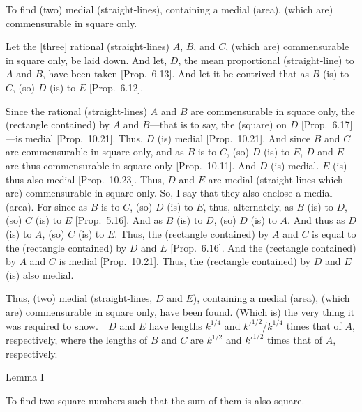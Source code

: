 To find (two) medial (straight-lines),
containing a medial (area), (which are)
commensurable in square only.

\epsfysize=0.7in
\centerline{}

Let the [three] rational (straight-lines) $A$, $B$, and $C$, (which are)
commensurable in square only, be laid down. And let, $D$,  the mean proportional
(straight-line) to $A$ and $B$, have been taken [Prop.~6.13]. And let it be contrived that as
$B$ (is) to $C$, (so) $D$ (is) to $E$ [Prop.~6.12].

Since the rational (straight-lines) $A$ and $B$ are commensurable in square only, the (rectangle contained) by $A$ and $B$---that is to say, the
(square) on $D$ [Prop.~6.17]---is medial
[Prop.~10.21]. Thus, $D$ (is) medial [Prop.~10.21]. And
since $B$ and $C$ are commensurable in square only, and as $B$ is to $C$, (so) $D$ (is) to $E$, $D$ and $E$ are thus commensurable in square
only [Prop.~10.11]. And $D$ (is) medial.
$E$ (is) thus also medial [Prop.~10.23].
Thus, $D$ and $E$ are medial (straight-lines which are) commensurable
in square only. So, I say that they also enclose a medial (area). For since
as $B$ is to $C$, (so) $D$ (is) to $E$, thus, alternately, as $B$ (is) to $D$,
(so) $C$ (is) to $E$ [Prop.~5.16]. And as
$B$ (is) to $D$, (so) $D$ (is) to $A$. And thus as $D$ (is) to $A$, (so)
$C$ (is) to $E$. Thus, the (rectangle contained) by $A$ and $C$ is equal
to the (rectangle contained) by $D$ and $E$ [Prop.~6.16]. And the (rectangle contained) by 
$A$ and $C$ is medial [Prop.~10.21]. Thus, the (rectangle contained) by $D$ and $E$ (is)
also medial.

Thus, (two) medial (straight-lines, $D$ and $E$), containing a medial (area),
(which are) commensurable in square only, have been found. (Which is)
the very thing it was required to show.
{\footnotesize\noindent$^\dag$ $D$ and $E$ have lengths $k^{1/4}$ and $k'^{1/2}/k^{1/4}$ times that of $A$, respectively, where the lengths of $B$ and $C$ are
$k^{1/2}$ and $k'^{1/2}$ times that of $A$, respectively.}


\begin{center}
{\large Lemma I}
\end{center}

To find two square numbers such that
the sum of them is also  square.

\epsfysize=0.3in
\centerline{}

